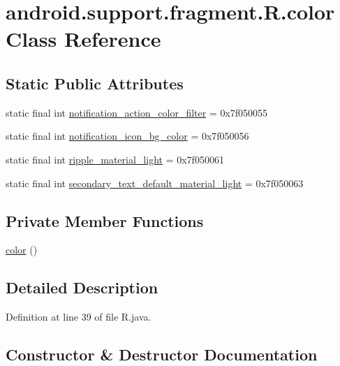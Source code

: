 \hypertarget{classandroid_1_1support_1_1fragment_1_1_r_1_1color}{}\section{android.\+support.\+fragment.\+R.\+color Class Reference}
\label{classandroid_1_1support_1_1fragment_1_1_r_1_1color}
\subsection*{Static Public Attributes}
\begin{DoxyCompactItemize}
\item 
static final int \mbox{\hyperlink{classandroid_1_1support_1_1fragment_1_1_r_1_1color_a19c7d4407581b392f3389b88ebdf6597}{notification\+\_\+action\+\_\+color\+\_\+filter}} = 0x7f050055
\item 
static final int \mbox{\hyperlink{classandroid_1_1support_1_1fragment_1_1_r_1_1color_a9df2919f981afbde1f1b486b1c24cb36}{notification\+\_\+icon\+\_\+bg\+\_\+color}} = 0x7f050056
\item 
static final int \mbox{\hyperlink{classandroid_1_1support_1_1fragment_1_1_r_1_1color_a7480abdd10ed4536230e8eb53b54c0a0}{ripple\+\_\+material\+\_\+light}} = 0x7f050061
\item 
static final int \mbox{\hyperlink{classandroid_1_1support_1_1fragment_1_1_r_1_1color_a7c56b5616006a7293aa178691505aa2d}{secondary\+\_\+text\+\_\+default\+\_\+material\+\_\+light}} = 0x7f050063
\end{DoxyCompactItemize}
\subsection*{Private Member Functions}
\begin{DoxyCompactItemize}
\item 
\mbox{\hyperlink{classandroid_1_1support_1_1fragment_1_1_r_1_1color_a6db564ca72fb528f5517e9e5d762121e}{color}} ()
\end{DoxyCompactItemize}


\subsection{Detailed Description}


Definition at line 39 of file R.\+java.



\subsection{Constructor \& Destructor Documentation}
\mbox{\label{classandroid_1_1support_1_1fragment_1_1_r_1_1color_a6db564ca72fb528f5517e9e5d762121e}} 
